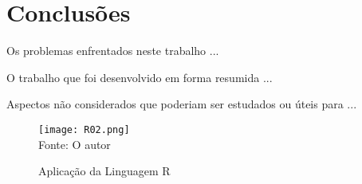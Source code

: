 %



\chapter{Conclus\~{o}es}


Os problemas enfrentados neste trabalho ...


O trabalho que foi desenvolvido em forma resumida ...

Aspectos n\~{a}o considerados que poderiam ser estudados ou \'{u}teis para ...



   \begin{figure}[H]
    \begin{center}
        \caption{Aplica\c{c}\~{a}o da Linguagem R} \label{ling2}
        \texttt{[image: R02.png]} \\
        {\tiny \sf Fonte: O autor }
    \end{center}
   \end{figure} 